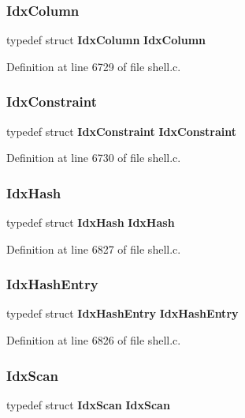 \subsubsection{Idx\+Column}
{\footnotesize\ttfamily typedef struct \textbf{ Idx\+Column} \textbf{ Idx\+Column}}



Definition at line 6729 of file shell.\+c.

\mbox{\label{shell_8c_a7dc4f709a858680eeda43953cbabd6b2}} 
\subsubsection{Idx\+Constraint}
{\footnotesize\ttfamily typedef struct \textbf{ Idx\+Constraint} \textbf{ Idx\+Constraint}}



Definition at line 6730 of file shell.\+c.

\mbox{\label{shell_8c_ac64ee4ff814ff1ba6117a8a7b5c339ad}} 
\subsubsection{Idx\+Hash}
{\footnotesize\ttfamily typedef struct \textbf{ Idx\+Hash} \textbf{ Idx\+Hash}}



Definition at line 6827 of file shell.\+c.

\mbox{\label{shell_8c_a03c34b73ccf717b3993679fdfced1ad8}} 
\subsubsection{Idx\+Hash\+Entry}
{\footnotesize\ttfamily typedef struct \textbf{ Idx\+Hash\+Entry} \textbf{ Idx\+Hash\+Entry}}



Definition at line 6826 of file shell.\+c.

\mbox{\label{shell_8c_abd9c0f136c1cf0d27bd908e0ad5f65a2}} 
\subsubsection{Idx\+Scan}
{\footnotesize\ttfamily typedef struct \textbf{ Idx\+Scan} \textbf{ Idx\+Scan}}



